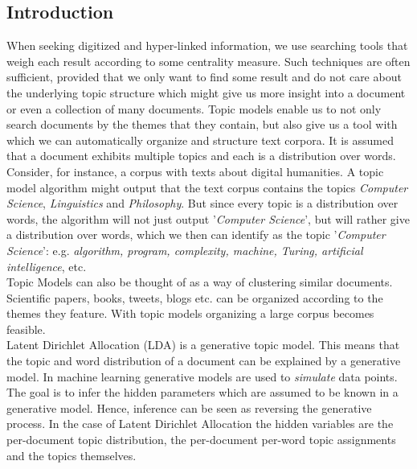 \documentclass[a4paper,ngerman, english]{atseminar}
\begin{document}
\subsection{Introduction}
When seeking digitized and hyper-linked information, we use searching tools that
weigh each result according to some centrality measure. Such techniques are 
often sufficient, provided that we only want to find some result and do not care
about the underlying topic structure which might give us more insight into a document or
even a collection of many documents.
Topic models enable us to not only search documents by the themes that they contain, but
also give us a tool with which we can automatically organize and structure text corpora.
It is assumed that a document exhibits multiple topics and each 
is a distribution over words. Consider, for instance, a corpus with texts about 
digital humanities. A topic model algorithm might output that the text corpus
contains the topics \textit{Computer Science}, \textit{Linguistics} and \textit{Philosophy}.
But since every topic is a distribution over words, the algorithm will not just output '\textit{Computer Science}', 
but will rather give a distribution over words, which we then can identify as the topic '\textit{Computer Science}':
e.g. \textit{algorithm, program, complexity, machine, Turing, artificial intelligence}, etc.
\\
Topic Models can also be thought of as a way of clustering similar documents.
Scientific papers, books, tweets, blogs etc. can be organized according to the 
themes they feature. With topic models organizing a large corpus becomes feasible. \\
Latent Dirichlet Allocation (LDA) is a generative topic model. This means that 
the topic and word distribution of a document can be explained by a generative
model. In machine learning generative models are used to \textit{simulate} data points.
The goal is to infer the hidden parameters which are assumed to be known in a 
generative model. Hence, inference can be seen as reversing the generative 
process. In the case of Latent Dirichlet Allocation the hidden variables are the
per-document topic distribution, the per-document per-word topic assignments and
the topics themselves. \\
\end{document}
